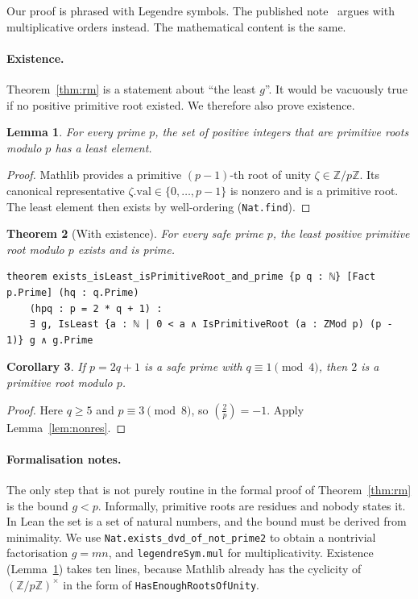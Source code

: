 \documentclass[11pt]{article}
\newtheorem{theorem}{Theorem}
\newtheorem{lemma}[theorem]{Lemma}
\newtheorem{corollary}[theorem]{Corollary}
\theoremstyle{remark}
\newcommand{\leg}[2]{\left(\frac{#1}{#2}\right)}
\newcommand{\lean}[1]{\texttt{#1}}
\begin{document}
Our proof is phrased with Legendre symbols. The published note~\cite{RM} argues with
multiplicative orders instead. The mathematical content is the same.

\paragraph{Existence.}
Theorem~\ref{thm:rm} is a statement about ``the least $g$''. It would be vacuously true if no
positive primitive root existed. We therefore also prove existence.

\begin{lemma}\label{lem:exists}
For every prime $p$, the set of positive integers that are primitive roots modulo $p$ has a least
element.
\end{lemma}
\begin{proof}
Mathlib provides a primitive $(p-1)$-th root of unity $\zeta\in\mathbb{Z}/p\mathbb{Z}$. Its
canonical representative $\zeta.\mathrm{val}\in\{0,\dots,p-1\}$ is nonzero and is a primitive
root. The least element then exists by well-ordering (\lean{Nat.find}).
\end{proof}

\begin{theorem}[With existence]\label{thm:rm-exists}
For every safe prime $p$, the least positive primitive root modulo $p$ exists and is prime.
\end{theorem}
\begin{lstlisting}
theorem exists_isLeast_isPrimitiveRoot_and_prime {p q : ℕ} [Fact p.Prime] (hq : q.Prime)
    (hpq : p = 2 * q + 1) :
    ∃ g, IsLeast {a : ℕ | 0 < a ∧ IsPrimitiveRoot (a : ZMod p) (p - 1)} g ∧ g.Prime
\end{lstlisting}

\begin{corollary}\label{cor:two}
If $p=2q+1$ is a safe prime with $q\equiv 1\pmod 4$, then $2$ is a primitive root modulo $p$.
\end{corollary}
\begin{proof}
Here $q\geq 5$ and $p\equiv 3\pmod 8$, so $\leg{2}{p}=-1$. Apply Lemma~\ref{lem:nonres}.
\end{proof}

\paragraph{Formalisation notes.}
The only step that is not purely routine in the formal proof of Theorem~\ref{thm:rm} is the bound
$g<p$. Informally, primitive roots are residues and nobody states it. In Lean the set is a set
of natural numbers, and the bound must be derived from minimality. We use
\lean{Nat.exists\_dvd\_of\_not\_prime2} to obtain a nontrivial factorisation $g=mn$, and
\lean{legendreSym.mul} for multiplicativity. Existence (Lemma~\ref{lem:exists}) takes ten lines,
because Mathlib already has the cyclicity of $(\mathbb{Z}/p\mathbb{Z})^\times$ in the form of
\lean{HasEnoughRootsOfUnity}.
\end{document}
